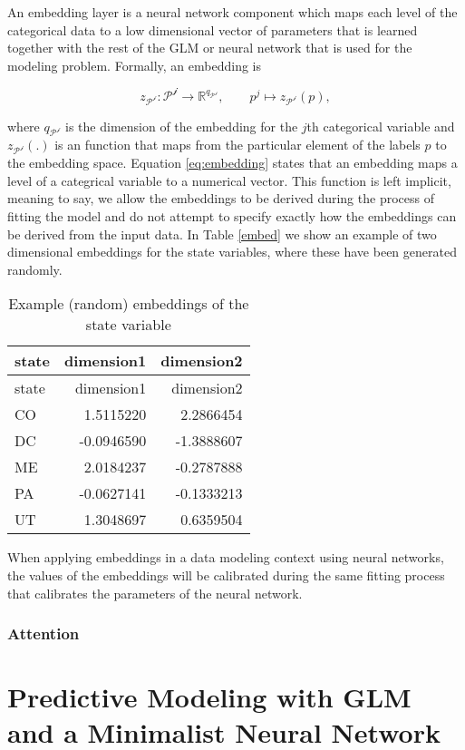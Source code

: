 \documentclass{article}
\begin{document}
An embedding layer is a neural network component which maps each level
of the categorical data to a low dimensional vector of parameters that
is learned together with the rest of the GLM or neural network that is
used for the modeling problem. Formally, an embedding is

\[
z_\mathcal{P^j} : \mathcal{P^j} \to \mathbb{R}^{q_\mathcal{P^j} }, \quad \quad p^j \mapsto  z_\mathcal{P^j}(p),
\]

where \(q_\mathcal{P^j}\) is the dimension of the embedding for the
\(j\)th categorical variable and \(z_\mathcal{P^j}(.)\) is an function
that maps from the particular element of the labels \(p\) to the
embedding space. Equation \ref{eq:embedding} states that an embedding
maps a level of a categrical variable to a numerical vector. This
function is left implicit, meaning to say, we allow the embeddings to be
derived during the process of fitting the model and do not attempt to
specify exactly how the embeddings can be derived from the input data.
In Table \ref{embed} we show an example of two dimensional embeddings
for the state variables, where these have been generated randomly.

\begin{longtable}[]{@{}lrr@{}}
\caption{Example (random) embeddings of the state
variable}\tabularnewline
\toprule
state & dimension1 & dimension2\tabularnewline
\midrule
\endfirsthead
\toprule
state & dimension1 & dimension2\tabularnewline
\midrule
\endhead
CO & 1.5115220 & 2.2866454\tabularnewline
DC & -0.0946590 & -1.3888607\tabularnewline
ME & 2.0184237 & -0.2787888\tabularnewline
PA & -0.0627141 & -0.1333213\tabularnewline
UT & 1.3048697 & 0.6359504\tabularnewline
\bottomrule
\end{longtable}

When applying embeddings in a data modeling context using neural
networks, the values of the embeddings will be calibrated during the
same fitting process that calibrates the parameters of the neural
network.

\hypertarget{attention}{%
\subsubsection{Attention}\label{attention}}

\hypertarget{predictive-modeling-with-glm-and-a-minimalist-neural-network}{%
\section{Predictive Modeling with GLM and a Minimalist Neural
Network}\label{predictive-modeling-with-glm-and-a-minimalist-neural-network}}
\end{document}
